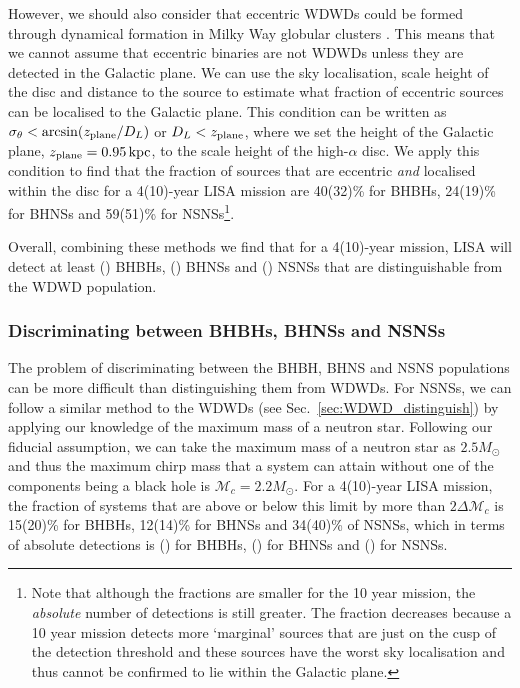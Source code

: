 However, we should also consider that eccentric WDWDs could be formed through dynamical formation in Milky Way globular clusters \citep[e.g.][]{Willems+2007, Kremer+2018}. This means that we cannot assume that eccentric binaries are not WDWDs unless they are detected in the Galactic plane. We can use the sky localisation, scale height of the disc and distance to the source to estimate what fraction of eccentric sources can be localised to the Galactic plane. This condition can be written as $\sigma_\theta < \arcsin(z_{\rm plane} / D_L)$ or $D_L < z_{\rm plane}$, where we set the height of the Galactic plane, $z_{\rm plane}=0.95 \unit{kpc}$, to the scale height of the high-$\alpha$ disc. We apply this condition to find that the fraction of sources that are eccentric \textit{and} localised within the disc for a 4(10)-year LISA mission are 40(32)\% for BHBHs, 24(19)\% for BHNSs and 59(51)\% for NSNSs\footnote{Note that although the fractions are smaller for the 10 year mission, the \textit{absolute} number of detections is still greater. The fraction decreases because a 10 year mission detects more `marginal' sources that are just on the cusp of the detection threshold and these sources have the worst sky localisation and thus cannot be confirmed to lie within the Galactic plane.}.

Overall, combining these methods we find that for a 4(10)-year mission, LISA will detect at least \BHBHNotWDWDFour{}(\BHBHNotWDWDTen{}) BHBHs, \BHNSNotWDWDFour{}(\BHNSNotWDWDTen{}) BHNSs and \NSNSNotWDWDFour{}(\NSNSNotWDWDTen{}) NSNSs that are distinguishable from the WDWD population.

\subsubsection{Discriminating between BHBHs, BHNSs and NSNSs}

The problem of discriminating between the BHBH, BHNS and NSNS populations can be more difficult than distinguishing them from WDWDs. For NSNSs, we can follow a similar method to the WDWDs (see Sec.~\ref{sec:WDWD_distinguish}) by applying our knowledge of the maximum mass of a neutron star. Following our fiducial assumption, we can take the maximum mass of a neutron star as $2.5 \unit{M_{\odot}}$ and thus the maximum chirp mass that a system can attain without one of the components being a black hole is $\mathcal{M}_{c} = 2.2 \unit{M_\odot}$. For a 4(10)-year LISA mission, the fraction of systems that are above or below this limit by more than $2 \Delta \mathcal{M}_c$ is 15(20)\% for BHBHs, 12(14)\% for BHNSs and 34(40)\% of NSNSs, which in terms of absolute detections is \BHBHDistinguishedFour{}(\BHBHDistinguishedTen{}) for BHBHs, \BHNSDistinguishedFour{}(\BHNSDistinguishedTen{}) for BHNSs and \NSNSDistinguishedFour{}(\NSNSDistinguishedTen{}) for NSNSs.

